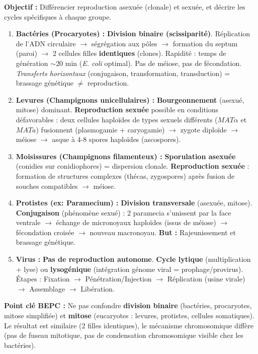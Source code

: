 \documentclass[11pt]{article}
\begin{document}
\begin{methode}
    \textbf{Objectif :} Différencier reproduction asexuée (clonale) et sexuée, et décrire les cycles spécifiques à chaque groupe.
    \begin{enumerate}
        \item \textbf{Bactéries (Procaryotes) :} \textbf{Division binaire (scissiparité)}. Réplication de l'ADN circulaire $\rightarrow$ ségrégation aux pôles $\rightarrow$ formation du septum (paroi) $\rightarrow$ 2 cellules filles \textbf{identiques} (clones). Rapidité : temps de génération $\sim 20$ min (\emph{E. coli} optimal). Pas de méiose, pas de fécondation. \textit{Transferts horizontaux} (conjugaison, transformation, transduction) = brassage génétique $\neq$ reproduction.
        \item \textbf{Levures (Champignons unicellulaires) :} \textbf{Bourgeonnement} (asexué, mitose) dominant. \textbf{Reproduction sexuée} possible en conditions défavorables : deux cellules haploïdes de types sexuels différents ($MAT\alpha$ et $MATa$) fusionnent (plasmogamie + caryogamie) $\rightarrow$ zygote diploïde $\rightarrow$ méiose $\rightarrow$ asque à 4-8 spores haploïdes (ascospores).
        \item \textbf{Moisissures (Champignons filamenteux) :} \textbf{Sporulation asexuée} (conidies sur conidiophores) = dispersion clonale. \textbf{Reproduction sexuée} : formation de structures complexes (thécas, zygospores) après fusion de souches compatibles $\rightarrow$ méiose.
        \item \textbf{Protistes (ex: Paramecium) :} \textbf{Division transversale} (asexuée, mitose). \textbf{Conjugaison} (phénomène sexué) : 2 paramecia s'unissent par la face ventrale $\rightarrow$ échange de micronoyaux haploïdes (issus de méiose) $\rightarrow$ fécondation croisée $\rightarrow$ nouveau macronoyau. \textbf{But :} Rajeunissement et brassage génétique.
        \item \textbf{Virus :} \textbf{Pas de reproduction autonome}. \textbf{Cycle lytique} (multiplication + lyse) ou \textbf{lysogénique} (intégration génome viral = prophage/provirus). Étapes : Fixation $\rightarrow$ Pénétration/Injection $\rightarrow$ Réplication (usine virale) $\rightarrow$ Assemblage $\rightarrow$ Libération.
    \end{enumerate}
    \textbf{Point clé BEPC :} Ne pas confondre \textbf{division binaire} (bactéries, procaryotes, mitose simplifiée) et \textbf{mitose} (eucaryotes : levures, protistes, cellules somatiques). Le résultat est similaire (2 filles identiques), le mécanisme chromosomique diffère (pas de fuseau mitotique, pas de condensation chromosomique visible chez les bactéries).
\end{methode}
\end{document}
